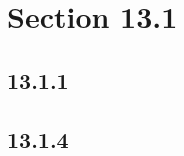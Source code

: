 





\section*{Section 13.1}

\subsection*{13.1.1}
\begin{enumerate}
\end{enumerate}

\subsection*{13.1.4}
\begin{enumerate}
\end{enumerate}


